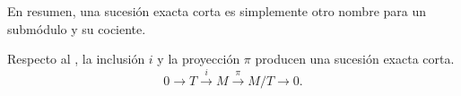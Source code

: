 En resumen, una sucesión exacta corta es simplemente otro nombre para un
submódulo y su cociente.

\begin{ejemplo}
	Respecto al , la inclusión $i$ y la proyección $\pi$ producen
	una sucesión exacta corta.
	\[
	0 \rightarrow T \xrightarrow{i}M \xrightarrow{\pi}M/T \rightarrow 0.
	\]
\end{ejemplo}
%
%
%
%
